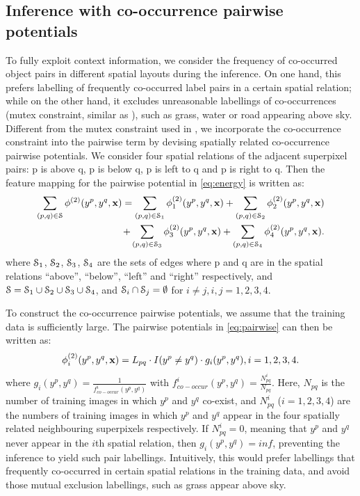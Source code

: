 \documentclass[10pt,3p]{elsarticle}
\def\bx{{\bf x}}
\let\x\bx
\begin{document}
\subsection{Inference with co-occurrence pairwise potentials}
\label{sec:co-occur}
To fully exploit context information, we consider the frequency of co-occurred object pairs in different spatial layouts during the inference.
On one hand, this prefers labelling of frequently co-occurred label pairs  in a certain spatial relation; while on the other hand, it excludes unreasonable labellings of co-occurrences (mutex constraint, similar as \cite{Roy14}), such as grass, water or road appearing above sky.
Different from the mutex constraint used in \cite{Roy14}, we incorporate the co-occurrence constraint into the pairwise term by devising spatially related co-occurrence pairwise potentials.
We consider four spatial relations of the adjacent superpixel pairs: p is above q, p is below q, p is left to q and p is right to q. Then the feature mapping for the pairwise potential in \eqref{eq:energy} is written as:
\begin{align}
\label{eq:pairwise}
 \sum_{(p,q) \in {\cal S}} \phi^{(2)}(y^{p}, y^{q}, \x)   =  \sum_{(p,q) \in {\cal S}_1} \phi_1^{(2)} (y^p, y^q, \x)  + \sum_{(p,q) \in {\cal S}_2} \phi_2^{(2)} (y^p, y^q, \x) \nonumber \\
+ \sum_{(p,q) \in {\cal S}_3} \phi_3^{(2)} (y^p, y^q, \x)  + \sum_{(p,q) \in {\cal S}_4} \phi_4^{(2)} (y^p, y^q, \x) .
\end{align}
where
%
${\cal S}_1$, ${\cal S}_2$, ${\cal S}_3$, ${\cal S}_4$ are the sets of edges where p and q are in the spatial relations ``above'', ``below'', ``left'' and ``right'' respectively, and ${\cal S} = {\cal S}_1 \cup {\cal S}_2 \cup {\cal S}_3 \cup {\cal S}_4$, and ${\cal S}_i \cap {\cal S}_j=\emptyset$ for $i \neq j, i,j=1,2,3,4$.
%


To construct the co-occurrence pairwise potentials, we assume that the training data is sufficiently large.
The pairwise potentials in \eqref{eq:pairwise} can then be written as:
\begin{align}
\phi_i^{(2)}(y^p, y^q, \x)= L_{pq} \cdot I(y^p \neq y^q) \cdot g_i(y^p, y^q), i=1,2,3,4.
\end{align}
where $g_i(y^p, y^q) = \frac{1}{f^i_{co-occur}(y^p, y^q)}$ with $f^i_{co-occur}(y^p, y^q)=\frac{N^i_{pq}}{N_{pq}}$. Here, $N_{pq}$ is the number of training images in which $y^p$ and $y^q$ co-exist, and $N^i_{pq}$ ($i=1,2,3,4$) are the numbers of training images in which $y^p$ and $y^q$ appear in the four spatially related neighbouring superpixels respectively.
If $N^i_{pq}=0$, meaning that  $y^p$ and $y^q$  never appear in the $i$th spatial relation, then $g_i(y^p, y^q)=inf$, preventing the inference to yield such pair labellings.
Intuitively, this would prefer labellings that frequently co-occurred in certain spatial relations in the training data, and  avoid those mutual exclusion labellings,  such as grass appear above sky.
\end{document}
